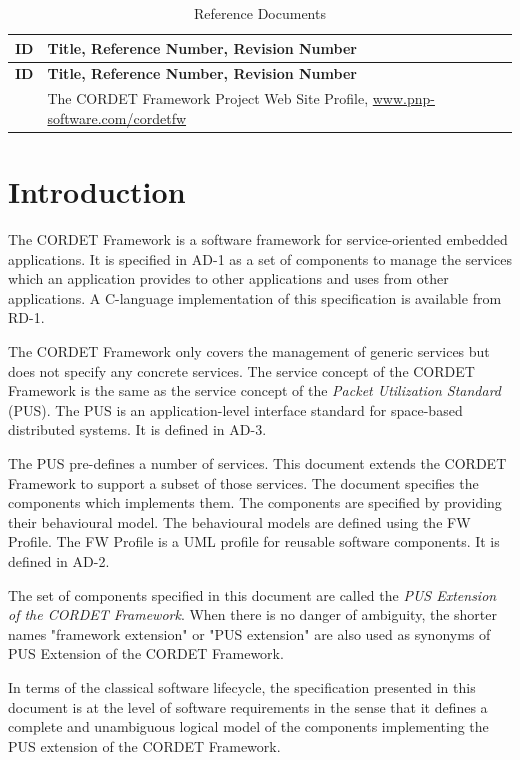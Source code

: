 \documentclass[a4paper,10pt]{article}
\let\stdsection\section
\renewcommand\section{\newpage\stdsection}
\begin{document}
\begin{longtable}{|c|p{11cm}|}
\caption{Reference Documents} \label{tab:refDoc}\\
\hline
\rowcolor{light-gray}
\textbf{ID} & \textbf{Title, Reference Number, Revision Number} \\
\hline\hline
\endfirsthead
\rowcolor{light-gray}
\textbf{ID} & \textbf{Title, Reference Number, Revision Number} \\
\hline\hline
\endhead
[PS-WEB] & The CORDET Framework Project Web Site Profile, \url{www.pnp-software.com/cordetfw} \\
\hline
\end{longtable}


\newpage


\section{Introduction}
The CORDET Framework is a software framework for service-oriented embedded applications. It is specified in AD-1 as a set of components to manage the services which an application provides to other applications and uses from other applications. A C-language implementation of this specification is available from RD-1.

The CORDET Framework only covers the management of generic services but does not specify any concrete services. The service concept of the CORDET Framework is the same as the service concept of the \textit{Packet Utilization Standard} (PUS). The PUS is an application-level interface standard for space-based distributed systems. It is defined in AD-3.

The PUS pre-defines a number of services. This document extends the CORDET Framework to support a subset of those services. The document specifies the components which implements them. The components are specified by providing their behavioural model. The behavioural models are defined using the FW Profile. The FW Profile is a UML profile for reusable software components. It is defined in AD-2.

The set of components specified in this document are called the \textit{PUS Extension of the CORDET Framework}. When there is no danger of ambiguity, the shorter names "framework extension" or "PUS extension" are also used as synonyms of PUS Extension of the CORDET Framework.

In terms of the classical software lifecycle, the specification presented in this document is at the level of software requirements in the sense that it defines a complete and unambiguous logical model of the components implementing the PUS extension of the CORDET Framework.
\end{document}
